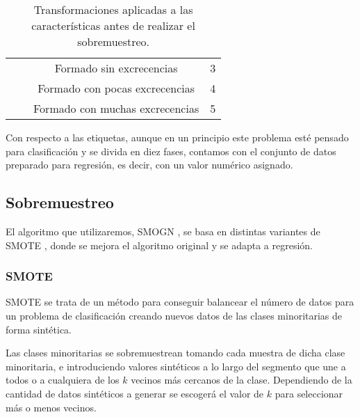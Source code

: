 \begin{table}[H]
{\begin{tabular}{|c|c|c|c|}
                                                      &                            & Formado sin excrecencias        & 3                                \\ \cline{3-4}
                                                      &                            & Formado con pocas excrecencias  & 4                                \\ \cline{3-4}
                                                      &                            & Formado con muchas excrecencias & 5                                \\ \hline
\end{tabular}%
}
\caption{Transformaciones aplicadas a las características antes de realizar el sobremuestreo.}\label{table:transformaciones_numericas}

\end{table}

Con respecto a las etiquetas, aunque en un principio este problema esté pensado para clasificación y se divida en diez fases, contamos con el conjunto de datos preparado para regresión, es decir, con un valor numérico asignado.


\subsection{Sobremuestreo}

El algoritmo que utilizaremos, SMOGN \cite{SMOGN}, se basa en distintas variantes de SMOTE \cite{SMOTE}, donde se mejora el algoritmo original y se adapta a regresión.

\subsubsection{SMOTE}

SMOTE se trata de un método para conseguir balancear el número de datos para un problema de clasificación creando nuevos datos de las clases minoritarias de forma sintética.

Las clases minoritarias se sobremuestrean tomando cada muestra de dicha clase minoritaria, e introduciendo valores sintéticos a lo largo del segmento que une a todos o a cualquiera de los $k$ vecinos más cercanos de la clase. Dependiendo de la cantidad de datos sintéticos a generar se escogerá el valor de $k$ para seleccionar más o menos vecinos.


